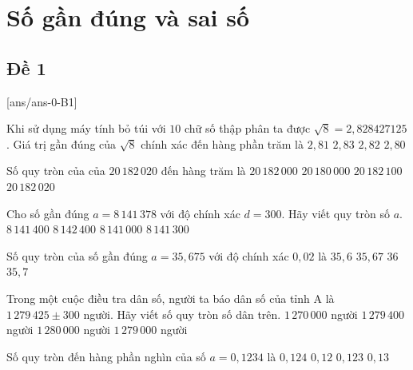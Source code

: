 \section{Số gần đúng và sai số}

\subsection{Đề 1}
[ans/ans-0-B1]
\caulc
\begin{ex}%
	Khi sử dụng máy tính bỏ túi với $ 10$ chữ số thập phân ta được $\sqrt{8}=2,828427125$. Giá trị gần đúng của $\sqrt{8}$ chính xác đến hàng phần trăm là
	\choice
	{$ 2{,}81$}
	{\True $ 2{,}83$}
	{$ 2{,}82$}
	{$ 2{,}80$}
\end{ex}

\begin{ex}%
	Số quy tròn của của $20 \, 182 \, 020$ đến hàng trăm là
	\choice
	{\True $20\, 182 \, 000$}
	{$20 \, 180 \, 000$}
	{$20\, 182 \, 100$}
	{$20\, 182\, 020$}
\end{ex}

\begin{ex}%
	Cho số gần đúng $a=8\,141\,378$ với độ chính xác $d=300$. Hãy viết quy tròn số $a$.
	\choice
	{$8\,141\,400$}
	{$8\,142\,400$}
	{\True $8\,141\,000$}
	{$8\,141\,300$}
\end{ex}

\begin{ex}%
	Số quy tròn của số gần đúng $ a=35{,}675$ với độ chính xác $ 0{,}02$ là
	\choice
	{$35{,}6$}
	{$35{,}67$}
	{$36$}
	{\True $35{,}7$}
\end{ex}

\begin{ex}%
	Trong một cuộc điều tra dân số, người ta báo dân số của tỉnh A là $ 1\, 279 \, 425\pm 300$ người. Hãy viết số quy tròn số dân trên.
	\choice
	{$ 1\, 270\, 000$ người}
	{$ 1\, 279\, 400$ người}
	{$ 1\, 280\, 000$ người}
	{\True $ 1\, 279\, 000$ người}
\end{ex}

\begin{ex}%
	Số quy tròn đến hàng phần nghìn của số $ a=0{,}1234$ là
	\choice
	{$ 0{,}124$}
	{$ 0{,}12$}
	{\True $ 0{,}123$}
	{$ 0{,}13$}
\end{ex}

